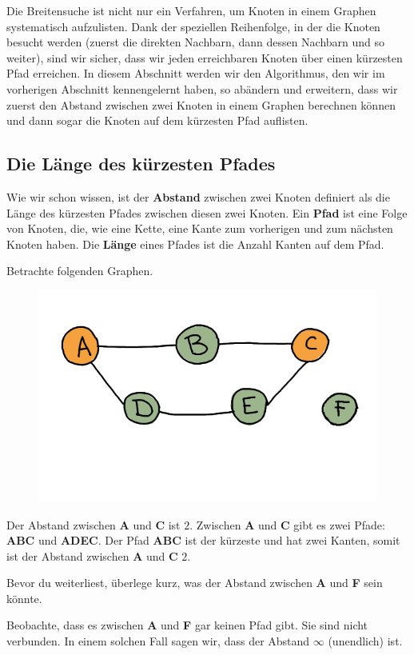 Die Breitensuche ist nicht nur ein Verfahren, um Knoten in einem Graphen systematisch aufzulisten. Dank der speziellen Reihenfolge, in der die Knoten besucht werden (zuerst die direkten Nachbarn, dann dessen Nachbarn und so weiter), sind wir sicher, dass wir jeden erreichbaren Knoten über einen kürzesten Pfad erreichen. In diesem Abschnitt werden wir den Algorithmus, den wir im vorherigen Abschnitt kennengelernt haben, so abändern und erweitern, dass wir zuerst den Abstand zwischen zwei Knoten in einem Graphen berechnen können und dann sogar die Knoten auf dem kürzesten Pfad auflisten.

\subsection{Die Länge des kürzesten Pfades}

Wie wir schon wissen, ist der \textbf{Abstand} zwischen zwei Knoten definiert als die Länge des kürzesten Pfades zwischen diesen zwei Knoten. Ein \textbf{Pfad} ist eine Folge von Knoten, die, wie eine Kette, eine Kante zum vorherigen und zum nächsten Knoten haben. Die \textbf{Länge} eines Pfades ist die Anzahl Kanten auf dem Pfad.

\begin{beispiel}
Betrachte folgenden Graphen.
\begin{figure}[H]
\centering
\includegraphics[width=0.5\linewidth]{Pictures/SP/abstand_def.png} 
\end{figure}
Der Abstand zwischen \textbf{A} und \textbf{C} ist \(2\). Zwischen \textbf{A} und \textbf{C} gibt es zwei Pfade: \textbf{ABC} und \textbf{ADEC}. Der Pfad \textbf{ABC} ist der kürzeste und hat zwei Kanten, somit ist der Abstand zwischen \textbf{A} und \textbf{C} \(2\).

Bevor du weiterliest, überlege kurz, was der Abstand zwischen \textbf{A} und \textbf{F} sein könnte.

Beobachte, dass es zwischen \textbf{A} und \textbf{F} gar keinen Pfad gibt. Sie sind nicht verbunden. In einem solchen Fall sagen wir, dass der Abstand \(\infty\) (unendlich) ist.
\end{beispiel}

